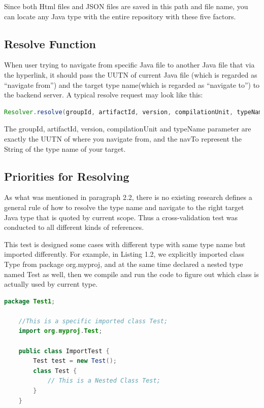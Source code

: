 \documentclass[runningheads]{llncs}
\begin{document}
Since both Html files and JSON files are saved in this path and file name, you can locate any Java type with the entire repository with these five factors.

\subsection{Resolve Function}
When user trying to navigate from specific Java file to another Java file that via the hyperlink, it should pass the UUTN of current Java file (which is regarded as “navigate from”) and the target type name(which is regarded as “navigate to”) to the backend server. A typical resolve request may look like this:

\begin{lstlisting}[language=Java, caption=Resolver example]
Resolver.resolve(groupId, artifactId, version, compilationUnit, typeName, navTo){/*...*/}
\end{lstlisting}

The groupId, artifactId, version, compilationUnit and typeName parameter are exactly the UUTN of where you navigate from, and the navTo represent the String of the type name of your target.

\subsection{Priorities for Resolving}

As what was mentioned in paragraph 2.2, there is no existing research defines a general rule of how to resolve the type name and navigate to the right target Java type that is quoted by current scope. Thus a cross-validation test was conducted to all different kinds of references.

This test is designed some cases with different type with same type name but imported differently. For example, in Listing 1.2, we explicitly imported class Type from package org.myproj, and at the same time declared a nested type named Test as well, then we compile and run the code to figure out which class is actually used by current type. 

\begin{lstlisting}[language=Java, caption=Sample code to show the complexity of Java]
	package Test1;

	//This is a specific imported class Test;
	import org.myproj.Test;
	
	public class ImportTest {
		Test test = new Test();
		class Test {
			// This is a Nested Class Test;
		}
	}
\end{lstlisting}
\end{document}
